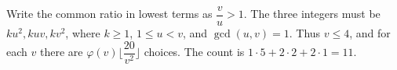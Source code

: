 Write the common ratio in lowest terms as $\dfrac{v}{u}>1$. The three integers must be $ku^2,kuv,kv^2$, where $k\ge1$, $1\le u<v$, and $\gcd(u,v)=1$. Thus $v\le4$, and for each $v$ there are $\varphi(v)\lfloor\dfrac{20}{v^2}\rfloor$ choices. The count is $1\cdot5+2\cdot2+2\cdot1=\boxed{11}$.
